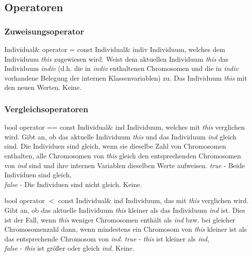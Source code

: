 \documentclass{report}
\begin{document}
\subsection{Operatoren}

\subsubsection{Zuweisungsoperator}

\setNormalInstance
\printMethodWithOneParam
{Individual\&}
{operator =}
{const Individual\&}
{indiv}
{Individuum, welches dem Individuum {\em this} zugewiesen wird.}
{Weist dem aktuellen Individuum {\em this}
    das Individuum {\em indiv} (d.h. die in {\em indiv} enthaltenen Chromosomen
    und die in {\em indiv} vorhandene Belegung der internen Klassenvariablen)
    zu.}
{Das Individuum {\em this} mit den neuen Werten.}
{Keine.}

\subsubsection{Vergleichsoperatoren}

\setConstInstance
\printMethodWithOneParam
{bool}
{operator ==}
{const Individual\&}
{ind}
{Individuum, welches mit {\em this} verglichen wird.}
{Gibt an, ob das aktuelle Individuum {\em this}
    und das Individuum {\em ind} gleich sind. Die Individuen sind gleich, 
    wenn sie dieselbe Zahl von Chromosomen enthalten, alle Chromosomen
    von {\em this} gleich den entsprechenden Chromosomen von {\em ind}
    sind und ihre internen Variablen dieselben
    Werte aufweisen.}
{
 {\em true}  - Beide Individuen sind gleich,\\
 {\em false} - Die Individuen sind nicht gleich.}
{Keine.}

\vspace{4ex}

\setConstInstance
\printMethodWithOneParam
{bool}
{operator $<$}
{const Individual\&}
{ind}
{Individuum, das mit {\em this} verglichen wird.}    
{Gibt an, ob das aktuelle Individuum {\em this}
    kleiner als das Individuum {\em ind} ist. Dies ist der Fall, wenn 
    {\em this} weniger Chromosomen enth\"alt als {\em ind} bzw. bei
    gleicher Chromosomenzahl dann, wenn mindestens ein Chromosom
    von {\em this} kleiner ist als das entsprechende Chromosom
    von {\em ind}.}
{
 {\em true}  - {\em this} ist kleiner als {\em ind},\\
 {\em false} - {\em this} ist gr\"o{\ss}er oder gleich {\em ind}.}
{Keine.}
\end{document}
